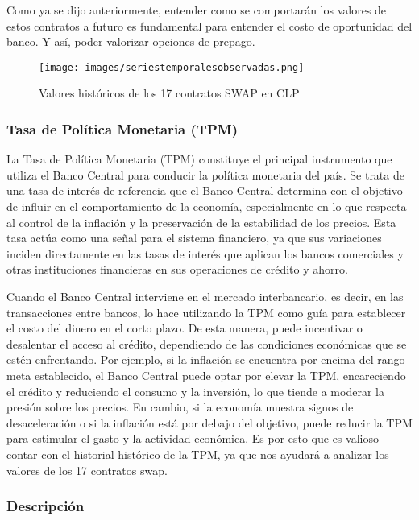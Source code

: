 \qquad Como ya se dijo anteriormente, entender como se comportarán los valores de estos contratos a futuro es fundamental para entender el costo de oportunidad del banco. Y así, poder valorizar opciones de prepago.
\begin{figure}[H]
  \centering
      \texttt{[image: images/seriestemporalesobservadas.png]}
  \caption{Valores históricos de los 17 contratos SWAP en CLP
  }\label{fig:0cupon}
\end{figure}
\subsubsection{Tasa de Política Monetaria (TPM)}

\qquad La Tasa de Política Monetaria (TPM) constituye el principal instrumento que utiliza el Banco Central para conducir la política monetaria del país. Se trata de una tasa de interés de referencia que el Banco Central determina con el objetivo de influir en el comportamiento de la economía, especialmente en lo que respecta al control de la inflación y la preservación de la estabilidad de los precios. Esta tasa actúa como una señal para el sistema financiero, ya que sus variaciones inciden directamente en las tasas de interés que aplican los bancos comerciales y otras instituciones financieras en sus operaciones de crédito y ahorro.

\qquad Cuando el Banco Central interviene en el mercado interbancario, es decir, en las transacciones entre bancos, lo hace utilizando la TPM como guía para establecer el costo del dinero en el corto plazo. De esta manera, puede incentivar o desalentar el acceso al crédito, dependiendo de las condiciones económicas que se estén enfrentando. Por ejemplo, si la inflación se encuentra por encima del rango meta establecido, el Banco Central puede optar por elevar la TPM, encareciendo el crédito y reduciendo el consumo y la inversión, lo que tiende a moderar la presión sobre los precios. En cambio, si la economía muestra signos de desaceleración o si la inflación está por debajo del objetivo, puede reducir la TPM para estimular el gasto y la actividad económica. Es por esto que es valioso contar con el historial histórico de la TPM, ya que nos ayudará a analizar los valores de los 17 contratos swap.

\subsubsection{Descripción}

